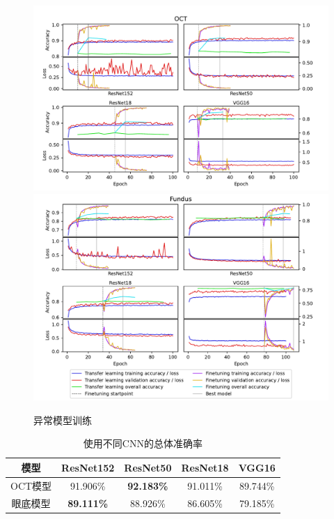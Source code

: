 \documentclass{article}
\begin{document}
		\begin{figure}[htbp]
			\centering
			\includegraphics[width=\linewidth]{Figs/abnormity_OCT_loss_and_acc.pdf}
			\includegraphics[width=\linewidth]{Figs/abnormity_Fundus_loss_and_acc.pdf}
			\caption{异常模型训练}
			\label{fig:A_train}
		\end{figure}
		
		\pagebreak
		
		{
		\fontsize{9}{12}\selectfont
		{
			\begin{table}
				\centering
				\caption{使用不同CNN的总体准确率}
				\label{tb:A_accuracies}
				\begin{tabular}{ccccc}
					\toprule
					模型&ResNet152&ResNet50&ResNet18&VGG16\\
					\midrule
					OCT模型   &91.906\%&\textbf{92.183\%}&91.011\%&89.744\% \\
					眼底模型&\textbf{89.111\%}&88.926\%&86.605\%&79.185\% \\
					\bottomrule
				\end{tabular}
			\end{table}
		}
		}	
		
\end{document}
